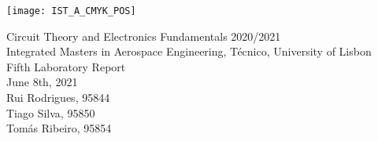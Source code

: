 
\thispagestyle {empty}

\texttt{[image: IST\_A\_CMYK\_POS]}

\begin{center}
%
\vspace{1.0cm}

\vspace{1cm}
{\FontLb Circuit Theory and Electronics Fundamentals 2020/2021} \\ %
\vspace{1cm}
{\FontSn Integrated Masters in Aerospace Engineering, Técnico, University of Lisbon} \\ %
\vspace{1cm}
{\FontSn Fifth Laboratory Report} \\
\vspace{1cm}
{\FontSn June 8th, 2021} \\ %
%
\vspace{1cm}
{\FontSn Rui Rodrigues, 95844 \\ Tiago Silva, 95850\\ Tomás Ribeiro, 95854}

\end{center}


